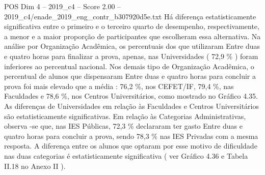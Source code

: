 \begin{textsample}{POS Dim 4 – 2019\_c4 – Score 2.00 – 2019\_c4/enade\_2019\_eng\_contr\_b307920d5e.txt}
Há diferença estatisticamente significativa entre o primeiro e o terceiro quarto de desempenho, respectivamente, a menor e a maior proporção de participantes que escolheram essa alternativa.
Na análise por Organização Acadêmica, os percentuais dos que utilizaram Entre duas e quatro horas para finalizar a prova, apenas, nas Universidades ( 72,9 \% ) foram inferiores ao percentual nacional.
Nos demais tipo de Organização Acadêmica, o percentual de alunos que dispensaram Entre duas e quatro horas para concluir a prova foi mais elevado que a média : 76,2 \%, nos CEFET/IF, 79,4 \%, nas Faculdades e 78,6 \%, nos Centros Universitários, como mostrado no Gráfico 4.35.
As diferenças de Universidades em relação às Faculdades e Centros Universitários são estatisticamente significativas.
Em relação às Categorias Administrativas, observa -se que, nas IES Públicas, 72,3 \% declararam ter gasto Entre duas e quatro horas para concluir a prova, sendo 78,3 \% nas IES Privadas com a mesma resposta.
A diferença entre os alunos que optaram por esse motivo de dificuldade nas duas categorias é estatisticamente significativa ( ver Gráfico 4.36 e Tabela II.18 no Anexo II ).

\end{textsample}
